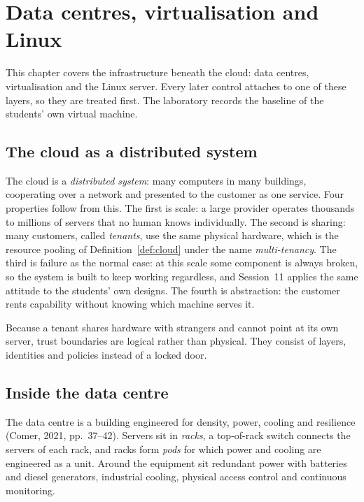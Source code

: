 \chapter{Data centres, virtualisation and Linux}

This chapter covers the infrastructure beneath the cloud: data centres,
virtualisation and the Linux server. Every later control attaches to one of
these layers, so they are treated first. The laboratory records the baseline
of the students' own virtual machine.

\section{The cloud as a distributed system}

The cloud is a \emph{distributed system}: many computers in many buildings,
cooperating over a network and presented to the customer as one service.
Four properties follow from this. The first is scale: a large provider
operates thousands to millions of servers that no human knows individually.
The second is sharing: many customers, called \emph{tenants}, use the same
physical hardware, which is the resource pooling of
Definition~\ref{def:cloud} under the name \emph{multi-tenancy}. The third is
failure as the normal case: at this scale some component is always broken,
so the system is built to keep working regardless, and Session~11 applies
the same attitude to the students' own designs. The fourth is abstraction:
the customer rents capability without knowing which machine serves it.

Because a tenant shares hardware with strangers and cannot point at its own
server, trust boundaries are logical rather than physical. They consist of
layers, identities and policies instead of a locked door.

\section{Inside the data centre}

The data centre is a building engineered for density, power, cooling and
resilience (Comer, 2021, pp.~37--42). Servers sit in \emph{racks}, a
top-of-rack switch connects the servers of each rack, and racks form
\emph{pods} for which power and cooling are engineered as a unit. Around the
equipment sit redundant power with batteries and diesel generators,
industrial cooling, physical access control and continuous monitoring.

